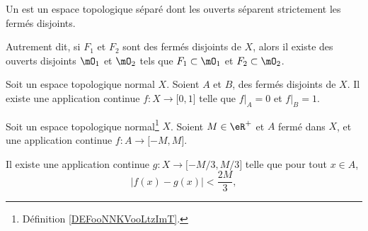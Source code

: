 \begin{definition}      \label{DEFooNNKVooLtzImT}
    Un  est un espace topologique séparé dont les ouverts séparent strictement les fermés disjoints.

    Autrement dit, si \( F_1\) et \( F_2\) sont des fermés disjoints de \( X\), alors il existe des ouverts disjoints \( \mO_1\) et \( \mO_2\) tels que  \( F_1\subset\mO_1\) et \( F_2\subset \mO_2\).
\end{definition}

\begin{theorem}     \label{THOooKYYEooLFcNpg}
    Soit un espace topologique normal \( X\). Soient \( A\) et \( B\), des fermés disjoints de \( X\). Il existe une application continue \( f\colon X\to \mathopen[ 0 , 1 \mathclose]\) telle que \( f|_A=0\) et \( f|_B=1\).
\end{theorem}

\begin{lemma}     \label{LEMooCLVAooTaNGJk}
    Soit un espace topologique normal\footnote{Définition \ref{DEFooNNKVooLtzImT}.} \( X\). Soient \( M\in \eR^+\) et \( A\) fermé dans \( X\), et une application continue \( f\colon A\to \mathopen[ -M , M \mathclose]\).

    Il existe une application continue \( g\colon X\to \mathopen[ -M/3 , M/3 \mathclose]\) telle que pour tout \( x\in A\),
            \begin{equation}
                | f(x)-g(x) |<\frac{ 2M }{ 3 },
            \end{equation}
\end{lemma}

